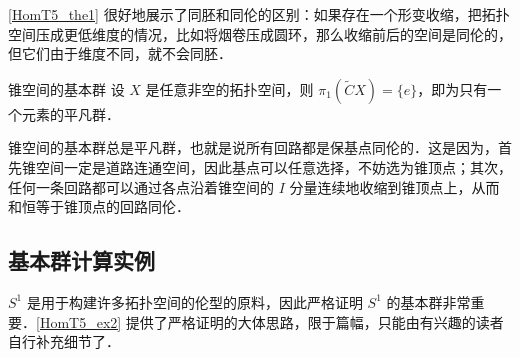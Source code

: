 \autoref{HomT5_the1} 很好地展示了同胚和同伦的区别：如果存在一个形变收缩，把拓扑空间压成更低维度的情况，比如将烟卷压成圆环，那么收缩前后的空间是同伦的，但它们由于维度不同，就不会同胚．

\begin{theorem}{锥空间的基本群}
设 $X$ 是任意非空的拓扑空间，则 $\pi_1(\widetilde{C}X)=\{e\}$，即为只有一个元素的平凡群．
\end{theorem}

锥空间的基本群总是平凡群，也就是说所有回路都是保基点同伦的．这是因为，首先锥空间一定是道路连通空间，因此基点可以任意选择，不妨选为锥顶点；其次，任何一条回路都可以通过各点沿着锥空间的 $I$ 分量连续地收缩到锥顶点上，从而和恒等于锥顶点的回路同伦．



\subsection{基本群计算实例}


$S^1$ 是用于构建许多拓扑空间的伦型的原料，因此严格证明 $S^1$ 的基本群非常重要．\autoref{HomT5_ex2} 提供了严格证明的大体思路，限于篇幅，只能由有兴趣的读者自行补充细节了．

